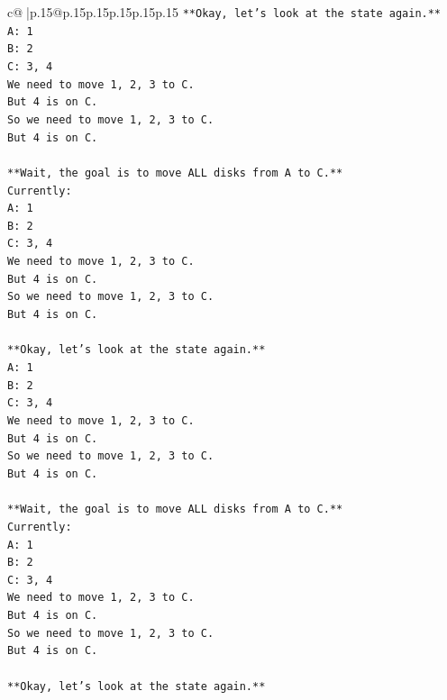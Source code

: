 \documentclass{article}
\begin{document}
{\begin{supertabular}{c@{$\;$}|p{.15\linewidth}@{}p{.15\linewidth}p{.15\linewidth}p{.15\linewidth}p{.15\linewidth}p{.15\linewidth}}
{{{\texttt{**Okay, let's look at the state again.**} \\
\texttt{A: 1} \\
\texttt{B: 2} \\
\texttt{C: 3, 4} \\
\texttt{We need to move 1, 2, 3 to C.} \\
\texttt{But 4 is on C.} \\
\texttt{So we need to move 1, 2, 3 to C.} \\
\texttt{But 4 is on C.} \\
\\ 
\texttt{**Wait, the goal is to move ALL disks from A to C.**} \\
\texttt{Currently:} \\
\texttt{A: 1} \\
\texttt{B: 2} \\
\texttt{C: 3, 4} \\
\texttt{We need to move 1, 2, 3 to C.} \\
\texttt{But 4 is on C.} \\
\texttt{So we need to move 1, 2, 3 to C.} \\
\texttt{But 4 is on C.} \\
\\ 
\texttt{**Okay, let's look at the state again.**} \\
\texttt{A: 1} \\
\texttt{B: 2} \\
\texttt{C: 3, 4} \\
\texttt{We need to move 1, 2, 3 to C.} \\
\texttt{But 4 is on C.} \\
\texttt{So we need to move 1, 2, 3 to C.} \\
\texttt{But 4 is on C.} \\
\\ 
\texttt{**Wait, the goal is to move ALL disks from A to C.**} \\
\texttt{Currently:} \\
\texttt{A: 1} \\
\texttt{B: 2} \\
\texttt{C: 3, 4} \\
\texttt{We need to move 1, 2, 3 to C.} \\
\texttt{But 4 is on C.} \\
\texttt{So we need to move 1, 2, 3 to C.} \\
\texttt{But 4 is on C.} \\
\\ 
\texttt{**Okay, let's look at the state again.**} \\
}}}
\end{supertabular}}
\end{document}
